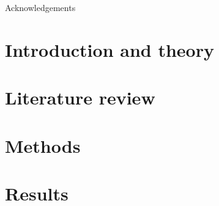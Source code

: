\documentclass[12pt,titlepage]{article}
\begin{document}
Acknowledgements

\tableofcontents

\clearpage
\section{Introduction and theory}

\section{Literature review}

\section{Methods}

\section{Results}


\end{document}
